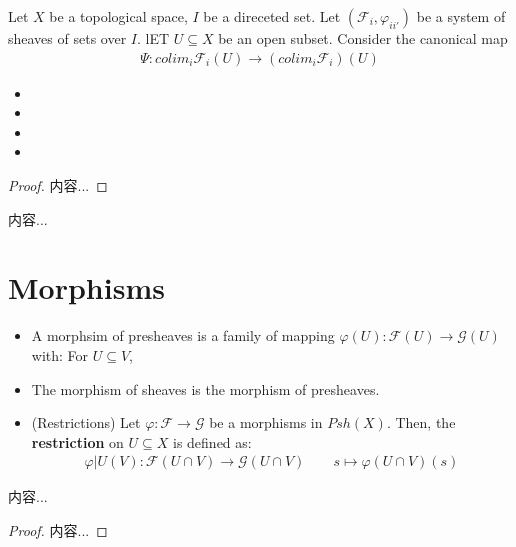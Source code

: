 \documentclass[Total.tex]{subfiles}
\begin{document}
				\begin{lemma}
					Let $X$ be a topological space, $I$ be a direceted set. Let $(\mathcal{F}_i,\varphi_{ii'})$ be a system of sheaves of sets over $I$. lET $U\subseteq X$ be an open subset. Consider the canonical map
					\begin{gather*}
						\Psi:colim_i\mathcal{F}_i(U)\rightarrow (colim_i\mathcal{F}_i)(U)
					\end{gather*}
					\begin{itemize}
						\item 
						\item 
						\item 
						\item 
					\end{itemize}
				\end{lemma}
				\begin{proof}
					内容...
				\end{proof}
				
				\begin{example}
					内容...
				\end{example}
		\section{Morphisms}
		
			\begin{Def}
				\begin{itemize}
					\item A morphsim of presheaves is a family of mapping $\varphi(U):\mathcal{F}(U)\rightarrow \mathcal{G}(U)$ with: For $U\subseteq V$,
					\begin{center}
					\end{center}
					\item The morphism of sheaves is the morphism of presheaves.
					
					\item (Restrictions) Let $\varphi:\mathcal{F}\rightarrow \mathcal{G}$ be a morphisms in $Psh(X)$. Then, the \textbf{restriction} on $U\subseteq X$ is defined as:
					\begin{gather*}
						\varphi|U(V):\mathcal{F}(U\cap V)\rightarrow \mathcal{G}(U\cap V)\qquad s\mapsto \varphi(U\cap V)(s) 
					\end{gather*}
				\end{itemize}
			\end{Def}
			\begin{lemma}
				内容...
			\end{lemma}
			\begin{proof}
				内容...
			\end{proof}
\end{document}
